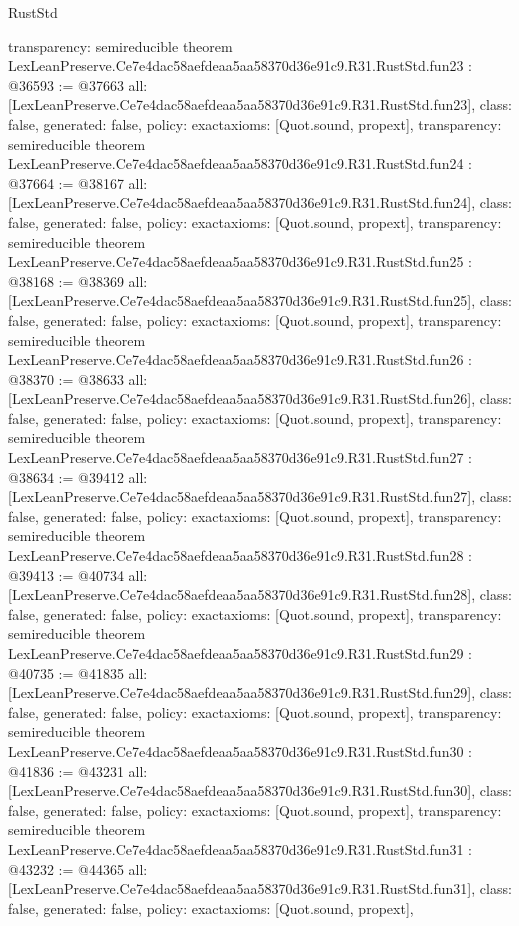 \begin{lexlean}{RustStd}
\begin{coremodule}
{  transparency: semireducible
}
theorem LexLeanPreserve.Ce7e4dac58aefdeaa5aa58370d36e91c9.R31.RustStd.fun23 : @36593 := @37663 {
  all: [LexLeanPreserve.Ce7e4dac58aefdeaa5aa58370d36e91c9.R31.RustStd.fun23],
  class: false,
  generated: false,
  policy: exact{axioms: [Quot.sound, propext]},
  transparency: semireducible
}
theorem LexLeanPreserve.Ce7e4dac58aefdeaa5aa58370d36e91c9.R31.RustStd.fun24 : @37664 := @38167 {
  all: [LexLeanPreserve.Ce7e4dac58aefdeaa5aa58370d36e91c9.R31.RustStd.fun24],
  class: false,
  generated: false,
  policy: exact{axioms: [Quot.sound, propext]},
  transparency: semireducible
}
theorem LexLeanPreserve.Ce7e4dac58aefdeaa5aa58370d36e91c9.R31.RustStd.fun25 : @38168 := @38369 {
  all: [LexLeanPreserve.Ce7e4dac58aefdeaa5aa58370d36e91c9.R31.RustStd.fun25],
  class: false,
  generated: false,
  policy: exact{axioms: [Quot.sound, propext]},
  transparency: semireducible
}
theorem LexLeanPreserve.Ce7e4dac58aefdeaa5aa58370d36e91c9.R31.RustStd.fun26 : @38370 := @38633 {
  all: [LexLeanPreserve.Ce7e4dac58aefdeaa5aa58370d36e91c9.R31.RustStd.fun26],
  class: false,
  generated: false,
  policy: exact{axioms: [Quot.sound, propext]},
  transparency: semireducible
}
theorem LexLeanPreserve.Ce7e4dac58aefdeaa5aa58370d36e91c9.R31.RustStd.fun27 : @38634 := @39412 {
  all: [LexLeanPreserve.Ce7e4dac58aefdeaa5aa58370d36e91c9.R31.RustStd.fun27],
  class: false,
  generated: false,
  policy: exact{axioms: [Quot.sound, propext]},
  transparency: semireducible
}
theorem LexLeanPreserve.Ce7e4dac58aefdeaa5aa58370d36e91c9.R31.RustStd.fun28 : @39413 := @40734 {
  all: [LexLeanPreserve.Ce7e4dac58aefdeaa5aa58370d36e91c9.R31.RustStd.fun28],
  class: false,
  generated: false,
  policy: exact{axioms: [Quot.sound, propext]},
  transparency: semireducible
}
theorem LexLeanPreserve.Ce7e4dac58aefdeaa5aa58370d36e91c9.R31.RustStd.fun29 : @40735 := @41835 {
  all: [LexLeanPreserve.Ce7e4dac58aefdeaa5aa58370d36e91c9.R31.RustStd.fun29],
  class: false,
  generated: false,
  policy: exact{axioms: [Quot.sound, propext]},
  transparency: semireducible
}
theorem LexLeanPreserve.Ce7e4dac58aefdeaa5aa58370d36e91c9.R31.RustStd.fun30 : @41836 := @43231 {
  all: [LexLeanPreserve.Ce7e4dac58aefdeaa5aa58370d36e91c9.R31.RustStd.fun30],
  class: false,
  generated: false,
  policy: exact{axioms: [Quot.sound, propext]},
  transparency: semireducible
}
theorem LexLeanPreserve.Ce7e4dac58aefdeaa5aa58370d36e91c9.R31.RustStd.fun31 : @43232 := @44365 {
  all: [LexLeanPreserve.Ce7e4dac58aefdeaa5aa58370d36e91c9.R31.RustStd.fun31],
  class: false,
  generated: false,
  policy: exact{axioms: [Quot.sound, propext]},
}
\end{coremodule}
\end{lexlean}

